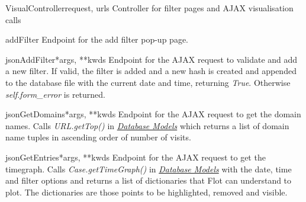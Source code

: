\documentclass[letterpaper,10pt,english]{manual}
\begin{document}
\hypertarget{webscavator.controllers.visualController.VisualController}{}\begin{classdesc}{VisualController}{request, urls}
Controller for filter pages and AJAX visualisation calls

\hypertarget{webscavator.controllers.visualController.VisualController.addFilter}{}\begin{methoddesc}{addFilter}{}
Endpoint for the add filter pop-up page.
\end{methoddesc}

\hypertarget{webscavator.controllers.visualController.VisualController.jsonAddFilter}{}\begin{methoddesc}{jsonAddFilter}{*args, **kwds}
Endpoint for the AJAX request to validate and add a new filter. If valid, the filter
is added and a new hash is created and appended to the database file with the current 
date and time, returning \emph{True}. Otherwise \emph{self.form\_error} is returned.
\end{methoddesc}

\hypertarget{webscavator.controllers.visualController.VisualController.jsonGetDomains}{}\begin{methoddesc}{jsonGetDomains}{*args, **kwds}
Endpoint for the AJAX request to get the domain names.
Calls \emph{URL.getTop()} in \hyperlink{--doc-models}{\emph{Database Models}} which returns a list of domain name tuples 
in ascending order of number of visits.
\end{methoddesc}

\hypertarget{webscavator.controllers.visualController.VisualController.jsonGetEntries}{}\begin{methoddesc}{jsonGetEntries}{*args, **kwds}
Endpoint for the AJAX request to get the timegraph. Calls \emph{Case.getTimeGraph()}
in \hyperlink{--doc-models}{\emph{Database Models}} with the date, time and filter options and returns a list of 
dictionaries that Flot can understand to plot. 
The dictionaries are those points to be highlighted, removed and visible.
\end{methoddesc}


\end{classdesc}
\end{document}
